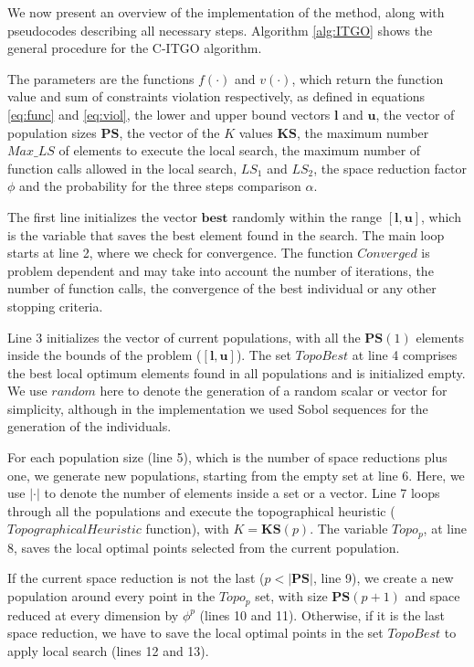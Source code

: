 We now present an overview of the implementation of the method, along with pseudocodes describing all necessary steps. Algorithm \ref{alg:ITGO} shows the general procedure for the C-ITGO algorithm.

The parameters are the functions $f(\cdot)$ and $v(\cdot)$, which return the function value and sum of constraints violation respectively, as defined in equations \ref{eq:func} and \ref{eq:viol}, the lower and upper bound vectors $\bm{l}$ and $\bm{u}$, the vector of population sizes $\bm{PS}$, the vector of the $K$ values $\bm{KS}$, the maximum number $Max\_LS$ of elements to execute the local search, the maximum number of function calls allowed in the local search, $LS_1$ and $LS_2$, the space reduction factor $\phi$ and the probability for the three steps comparison $\alpha$.






The first line initializes the vector $\bm{best}$ randomly within the range $[\bm{l}, \bm{u}]$, which is the variable that saves the best element found in the search. The main loop starts at line 2, where we check for convergence. The function $Converged$ is problem dependent and may take into account the number of iterations, the number of function calls, the convergence of the best individual or any other stopping criteria.

Line 3 initializes the vector of current populations, with all the $\bm{PS}(1)$ elements inside the bounds of the problem ($[\bm{l}, \bm{u}]$). The set $TopoBest$ at line 4 comprises the best local optimum elements found in all populations and is initialized empty. We use $random$ here to denote the generation of a random scalar or vector for simplicity, although in the implementation we used Sobol sequences for the generation of the individuals.

For each population size (line 5), which is the number of space reductions plus one, we generate new populations, starting from the empty set at line 6. Here, we use $|\cdot|$ to denote the number of elements inside a set or a vector. Line 7 loops through all the populations and execute the topographical heuristic ($TopographicalHeuristic$ function), with $K = \bm{KS}(p)$. The variable $Topo_p$, at line 8, saves the local optimal points selected from the current population.

If the current space reduction is not the last ($p < |\bm{PS}|$, line 9), we create a new population around every point in the $Topo_p$ set, with size $\bm{PS}(p + 1)$ and space reduced at every dimension by $\phi^p$ (lines 10 and 11). Otherwise, if it is the last space reduction, we have to save the local optimal points in the set $TopoBest$ to apply local search (lines 12 and 13).\\[-1em]


